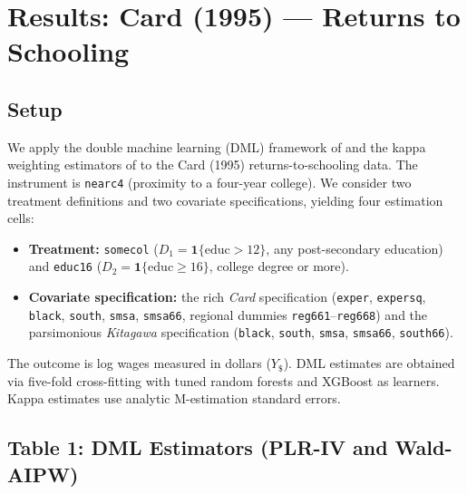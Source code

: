 \documentclass[12pt]{article}
\begin{document}
\section*{Results: Card (1995) --- Returns to Schooling}

\subsection*{Setup}

We apply the double machine learning (DML) framework of
\citet{chernozhukov2018double} and the kappa weighting estimators of
\citet{sloczynski2025abadie} to the Card (1995) returns-to-schooling
data. The instrument is \texttt{nearc4} (proximity to a four-year
college). We consider two treatment definitions and two covariate
specifications, yielding four estimation cells:

\begin{itemize}
  \item \textbf{Treatment:} \texttt{somecol} ($D_1 = \mathbf{1}\{\text{educ} > 12\}$,
        any post-secondary education) and
        \texttt{educ16} ($D_2 = \mathbf{1}\{\text{educ} \geq 16\}$,
        college degree or more).
  \item \textbf{Covariate specification:} the rich \emph{Card} specification
        (\texttt{exper}, \texttt{expersq}, \texttt{black}, \texttt{south},
        \texttt{smsa}, \texttt{smsa66}, regional dummies
        \texttt{reg661}--\texttt{reg668}) and the parsimonious
        \emph{Kitagawa} specification
        (\texttt{black}, \texttt{south}, \texttt{smsa}, \texttt{smsa66},
        \texttt{south66}).
\end{itemize}

The outcome is log wages measured in dollars ($Y_{\$}$). DML estimates
are obtained via five-fold cross-fitting with tuned random forests
and XGBoost as learners. Kappa estimates use analytic
M-estimation standard errors.

\subsection*{Table 1: DML Estimators (PLR-IV and Wald-AIPW)}
\end{document}
